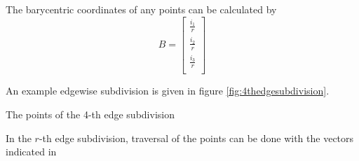 \documentclass{mitschrift}
\begin{document}
The barycentric coordinates of any points can be calculated by \begin{equation}
    B = \begin{bmatrix}
        \frac{i_1}{r} \\
        \frac{i_2}{r} \\
        \frac{i_3}{r} \\
    \end{bmatrix}
\end{equation}

An example edgewise subdivision is given in figure \ref{fig:4thedgesubdivision}.

\begin{Figure}
    \centering
    \caption{The points of the 4-th edge subdivision}
    \label{fig:4thedgesubdivision}
\end{Figure}

In the $r$-th edge subdivision, traversal of the points can be done with the vectors indicated in
\end{document}
